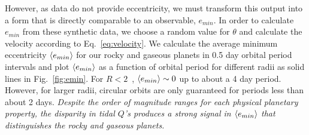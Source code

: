 However, as \kepler data do not provide eccentricity, we must transform this output
into a form that is directly comparable to an observable, \ie $e_{min}$. In order to
calculate $e_{min}$ from these synthetic data, we choose a random
value for $\theta$ and calculate the velocity according to
Eq.~\ref{eq:velocity}. We calculate the average minimum eccentricity
$\left< e_{min} \right>$ for our rocky and gaseous planets in 0.5 day orbital
period intervals and plot $\left< e_{min} \right>$ as a function of orbital
period for different radii as solid lines in Fig.~\ref{fig:emin}. For
$R < 2$~\rearth, $\left< e_{min} \right>
\sim 0$ up to about a 4 day period. However, for larger radii,
circular orbits are only guaranteed for periods less than about 2
days. \textit{Despite the order of magnitude ranges for each physical
  planetary property, the disparity in tidal $Q$'s produces a strong
  signal in $\left< e_{min} \right>$ that distinguishes the rocky and gaseous
  planets. }


